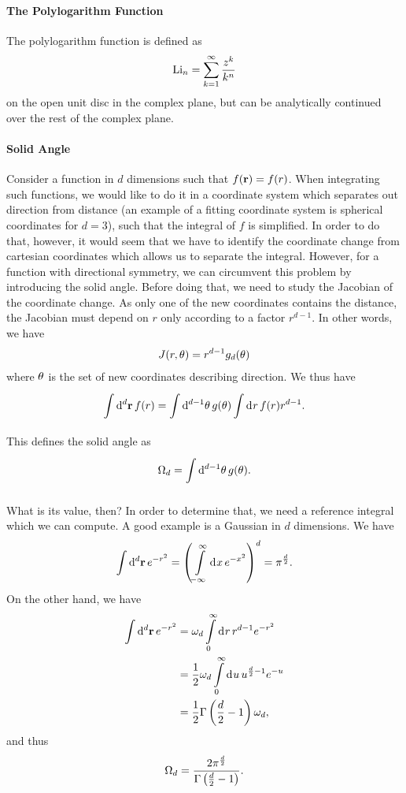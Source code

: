\paragraph{The Polylogarithm Function}
The polylogarithm function is defined as
\begin{align*}
	\text{Li}_{n} = \sum\limits_{k = 1}^{\infty}\frac{z^{k}}{k^{n}}
\end{align*}
on the open unit disc in the complex plane, but can be analytically continued over the rest of the complex plane.

\paragraph{Solid Angle}
Consider a function in $d$ dimensions such that $f(\vb{r}) = f(r)$. When integrating such functions, we would like to do it in a coordinate system which separates out direction from distance (an example of a fitting coordinate system is spherical coordinates for $d = 3$), such that the integral of $f$ is simplified. In order to do that, however, it would seem that we have to identify the coordinate change from cartesian coordinates which allows us to separate the integral. However, for a function with directional symmetry, we can circumvent this problem by introducing the solid angle. Before doing that, we need to study the Jacobian of the coordinate change. As only one of the new coordinates contains the distance, the Jacobian must depend on $r$ only according to a factor $r^{d - 1}$. In other words, we have
\begin{align*}
	J(r, \vb{\theta}) = r^{d - 1}g_{d}(\vb{\theta})
\end{align*}
where $\vb{\theta}$ is the set of new coordinates describing direction. We thus have
\begin{align*}
	\int\limits_{}^{}\dd[d]{\vb{r}}f(r) = \int\limits_{}^{}\dd[d - 1]{\vb{\theta}}g(\vb{\theta})\int\limits_{}^{}\dd[]{r}f(r)r^{d - 1}.
\end{align*}
This defines the solid angle as
\begin{align*}
	\Omega_{d} = \int\limits_{}^{}\dd[d - 1]{\vb{\theta}}g(\vb{\theta}).
\end{align*}

What is its value, then? In order to determine that, we need a reference integral which we can compute. A good example is a Gaussian in $d$ dimensions. We have
\begin{align*}
	\int\limits_{}^{}\dd[d]{\vb{r}}e^{-r^{2}} = \left(\int\limits_{-\infty}^{\infty}\dd[]{x}e^{-x^{2}}\right)^{d} = \pi^{\frac{d}{2}}.
\end{align*}
On the other hand, we have
\begin{align*}
	\int\limits_{}^{}\dd[d]{\vb{r}}e^{-r^{2}} &= \omega_{d}\int\limits_{0}^{\infty}\dd[]{r}r^{d - 1}e^{-r^{2}} \\
&= \frac{1}{2}\omega_{d}\int\limits_{0}^{\infty}\dd[]{u}u^{\frac{d}{2} - 1}e^{-u} \\
&= \frac{1}{2}\Gamma\left(\frac{d}{2} - 1\right)\omega_{d},
\end{align*}
and thus
\begin{align*}
	\Omega_{d} = \frac{2\pi^{\frac{d}{2}}}{\Gamma\left(\frac{d}{2} - 1\right)}.
\end{align*}